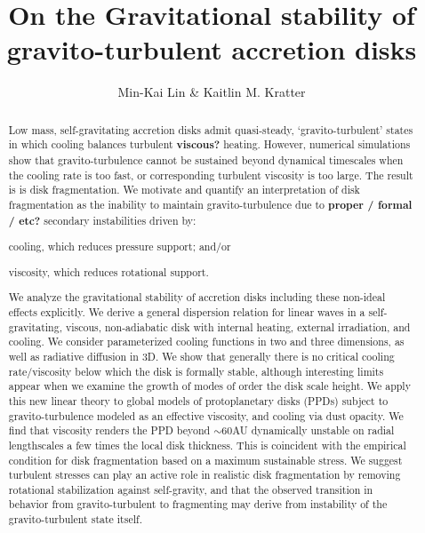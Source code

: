 \documentclass[iop, numberedappendix]{emulateapj}
\begin{document}
\title{On the Gravitational stability of gravito-turbulent accretion disks}
\author{Min-Kai Lin \& Kaitlin M. Kratter}

\begin{abstract}
Low mass, self-gravitating accretion disks admit quasi-steady,
`gravito-turbulent' states in which cooling balances turbulent {\bf viscous?}
heating. However, numerical simulations show that gravito-turbulence
cannot be sustained beyond dynamical timescales when the cooling rate is too fast,
or corresponding turbulent viscosity is too large. The result is is disk fragmentation.        
We motivate and quantify an interpretation of disk %
fragmentation as the inability to maintain gravito-turbulence due to  
{\bf proper / formal / etc?} secondary instabilities driven by:  
\begin{inparaenum}[1)] 
\item 
  cooling, which reduces pressure support; and/or
\item 
  viscosity, which reduces rotational support. 
\end{inparaenum}
We analyze the gravitational stability of accretion disks 
including these non-ideal effects explicitly.    
We derive a general dispersion relation for linear waves in a 
self-gravitating, viscous, non-adiabatic disk with internal heating,
external irradiation, and cooling. We  
consider parameterized cooling functions in two and three dimensions,
as well as %
radiative diffusion in 3D. We show that 
generally there is no critical cooling rate/viscosity below which 
the disk is formally stable, although interesting limits appear when we examine the growth
of modes of order the disk scale height. 
We apply this new linear theory to 
global models of protoplanetary disks (PPDs) subject to
gravito-turbulence modeled as an effective 
viscosity, and cooling via dust opacity. 
We find that viscosity renders the PPD beyond $\sim 60$AU dynamically
unstable on radial %
lengthscales a few times the local disk thickness. This is coincident 
with the empirical condition for disk fragmentation based on a
maximum sustainable stress. 
We suggest turbulent stresses can play an active role in realistic disk 
fragmentation by removing rotational stabilization against 
self-gravity, and that the observed transition in behavior from gravito-turbulent to fragmenting may derive from
instability of the gravito-turbulent state itself.
\end{abstract}
\end{document}
